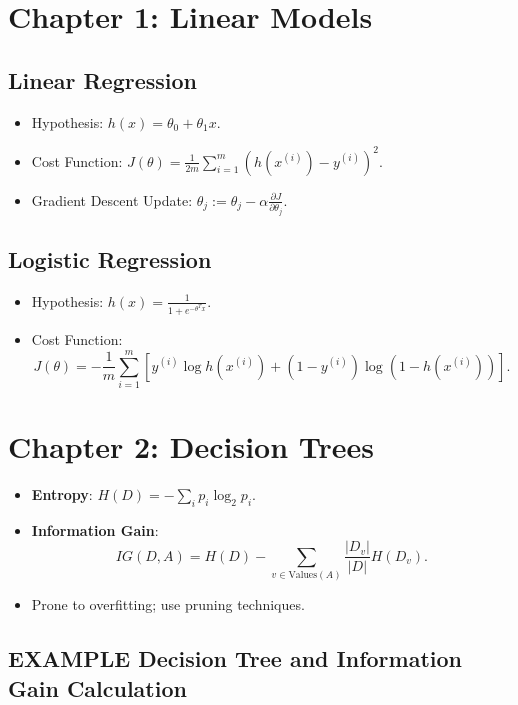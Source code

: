 \documentclass[10pt,a4paper]{article}
\begin{document}
\section*{Chapter 1: Linear Models}
\subsection*{Linear Regression}
\begin{itemize}
    \item Hypothesis: \( h(x) = \theta_0 + \theta_1 x \).
    \item Cost Function: \( J(\theta) = \frac{1}{2m} \sum_{i=1}^{m} (h(x^{(i)}) - y^{(i)})^2 \).
    \item Gradient Descent Update: \( \theta_j := \theta_j - \alpha \frac{\partial J}{\partial \theta_j} \).
\end{itemize}

\subsection*{Logistic Regression}
\begin{itemize}
    \item Hypothesis: \( h(x) = \frac{1}{1 + e^{-\theta^T x}} \).
    \item Cost Function:
    \[
    J(\theta) = -\frac{1}{m} \sum_{i=1}^{m} [y^{(i)} \log h(x^{(i)}) + (1 - y^{(i)}) \log(1 - h(x^{(i)}))].
    \]
\end{itemize}

\section*{Chapter 2: Decision Trees}
\begin{itemize}
    \item \textbf{Entropy}: \( H(D) = - \sum_{i} p_i \log_2 p_i \).
    \item \textbf{Information Gain}:
    \[
    IG(D, A) = H(D) - \sum_{v \in \text{Values}(A)} \frac{|D_v|}{|D|} H(D_v).
    \]
    \item Prone to overfitting; use pruning techniques.
\end{itemize}


\subsection*{EXAMPLE Decision Tree and Information Gain Calculation}
\end{document}
